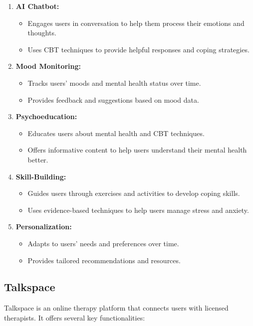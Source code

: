 \begin{enumerate}
    \item \textbf{AI Chatbot:}
    \begin{itemize}
        \item Engages users in conversation to help them process their emotions and thoughts.
        \item Uses CBT techniques to provide helpful responses and coping strategies.
    \end{itemize}
    \item \textbf{Mood Monitoring:}
    \begin{itemize}
        \item Tracks users' moods and mental health status over time.
        \item Provides feedback and suggestions based on mood data.
    \end{itemize}
    \item \textbf{Psychoeducation:}
    \begin{itemize}
        \item Educates users about mental health and CBT techniques.
        \item Offers informative content to help users understand their mental health better.
    \end{itemize}
    \item \textbf{Skill-Building:}
    \begin{itemize}
        \item Guides users through exercises and activities to develop coping skills.
        \item Uses evidence-based techniques to help users manage stress and anxiety.
    \end{itemize}
    \item \textbf{Personalization:}
    \begin{itemize}
        \item Adapts to users' needs and preferences over time.
        \item Provides tailored recommendations and resources.
    \end{itemize}
\end{enumerate}

\subsection{Talkspace}
Talkspace is an online therapy platform that connects users with licensed therapists. It offers several key functionalities:

